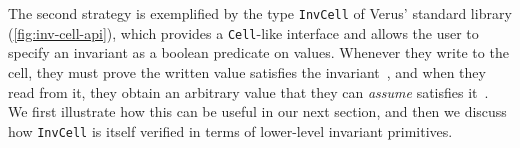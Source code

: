 The second strategy is exemplified by the type \verb`InvCell` of Verus' standard
library (\autoref{fig:inv-cell-api}), which provides a \verb`Cell`-like interface and allows the user to specify an invariant as a boolean predicate on values.
Whenever they write to the cell, they must prove the written value satisfies the invariant~,
and when they read from it, they obtain an arbitrary value that they can \emph{assume} satisfies it~.
We first illustrate how this can be useful in our next section, and then we
discuss how \verb`InvCell` is itself verified in terms of lower-level invariant primitives.





